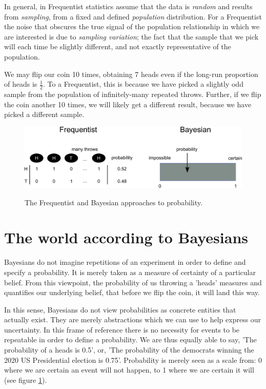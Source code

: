 \documentclass[11pt,fullpage]{book}
\begin{document}
In general, in Frequentist statistics assume that the data is \textit{random} and results from \textit{sampling}, from a fixed and defined \textit{population} distribution. For a Frequentist the noise that obscures the true signal of the population relationship in which we are interested is due to \textit{sampling variation}; the fact that the sample that we pick will each time be slightly different, and not exactly representative of the population. 

We may flip our coin 10 times, obtaining 7 heads even if the long-run proportion of heads is $\frac{1}{2}$. To a Frequentist, this is because we have picked a slightly odd sample from the population of infinitely-many repeated throws. Further, if we flip the coin another 10 times, we will likely get a different result, because we have picked a different sample.

\begin{figure}
\centering
\scalebox{0.3} 
{\includegraphics{Intro_FrequentistBayesProbability.pdf}}
\caption{The Frequentist and Bayesian approaches to probability.}\label{fig:Intro_FrequentistBayesProbability}
\end{figure}

\section{The world according to Bayesians}
Bayesians do not imagine repetitions of an experiment in order to define and specify a probability. It is merely taken as a measure of certainty of a particular belief. From this viewpoint, the probability of us throwing a 'heads' measures and quantifies our underlying belief, that before we flip the coin, it will land this way. 

In this sense, Bayesians do not view probabilities as concrete entities that actually exist. They are merely abstractions which we can use to help express our uncertainty. In this frame of reference there is no necessity for events to be repeatable in order to define a probability. We are thus equally able to say, 'The probability of a heads is 0.5', or, 'The probability of the democrats winning the 2020 US Presidential election is 0.75'. Probability is merely seen as a scale from: 0 where we are certain an event will not happen, to 1 where we are certain it will (see figure \ref{fig:Intro_FrequentistBayesProbability}). 
\end{document}
